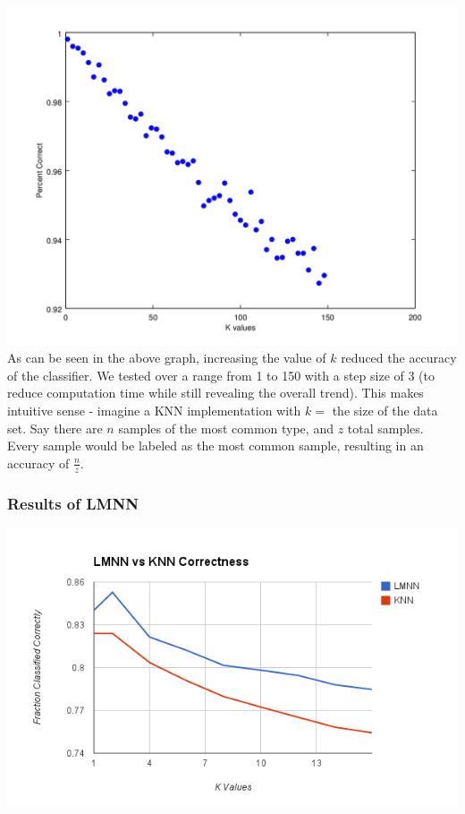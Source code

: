 \documentclass[11pt]{article}
\begin{document}
    \paragraph{}
    \includegraphics[scale=.66]{images/kValuesGraph.png}
    \\
    As can be seen in the above graph, increasing the value of $k$ reduced the accuracy of the classifier. We tested over a range from 1 to 150 with a step size of 3 (to reduce computation time while still revealing the overall trend). This makes intuitive sense - imagine a KNN implementation with $k = $ the size of the data set. Say there are $n$ samples of the most common type, and $z$ total samples. Every sample would be labeled as the most common sample, resulting in an accuracy of $\frac{n}{z}$.
    \subsubsection*{Results of LMNN}
    \includegraphics[scale=.66]{images/knnvslmnn.png}
\end{document}
